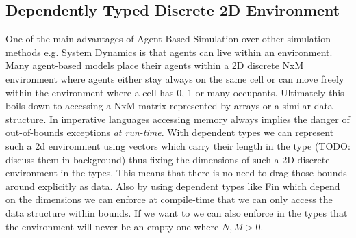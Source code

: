 \subsection{Dependently Typed Discrete 2D Environment}
\label{sub:dep_abs_2denv}
One of the main advantages of Agent-Based Simulation over other simulation methods e.g. System Dynamics is that agents can live within an environment. Many agent-based models place their agents within a 2D discrete NxM environment where agents either stay always on the same cell or can move freely within the environment where a cell has 0, 1 or many occupants. Ultimately this boils down to accessing a NxM matrix represented by arrays or a similar data structure. In imperative languages accessing memory always implies the danger of out-of-bounds exceptions \textit{at run-time}. With dependent types we can represent such a 2d environment using vectors which carry their length in the type (TODO: discuss them in background) thus fixing the dimensions of such a 2D discrete environment in the types. This means that there is no need to drag those bounds around explicitly as data. Also by using dependent types like Fin which depend on the dimensions we can enforce at compile-time that we can only access the data structure within bounds. If we want to we can also enforce in the types that the environment will never be an empty one where $N, M > 0$.

